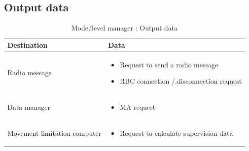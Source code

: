 \documentclass[nocc]{template/openetcs_report}
\begin{document}
\subsection{Output data}
			\begin{longtable}{|l|l|}
				\caption{Mode/level manager : Output data}\\ 
				\hline
				
					\begin{minipage}[t]{0.35\linewidth} \textbf{Destination}	\end{minipage} 
				&	\begin{minipage}[t]{0.65\linewidth} \textbf{Data} \end{minipage} \\
				
				\hline
																																									
					\begin{minipage}[t]{0.35\linewidth} Radio message	\end{minipage} 
				&	\begin{minipage}[t]{0.65\linewidth}
						\begin{itemize}
							\item Request to send a radio message
							\item RBC connection /.disconnection request
						\end{itemize}
					\end{minipage} \\
				
				\hline
				
					\begin{minipage}[t]{0.35\linewidth} Data manager	\end{minipage} 
				&	\begin{minipage}[t]{0.65\linewidth}
						\begin{itemize}
							\item MA request
						\end{itemize}			
					\end{minipage} \\
				
				\hline
					
					\begin{minipage}[t]{0.35\linewidth} Movement limitation computer	\end{minipage} 
				&	\begin{minipage}[t]{0.65\linewidth}
						\begin{itemize}
							\item Request to calculate supervision data
						\end{itemize}			
					\end{minipage} \\
				

\end{longtable}
\end{document}
